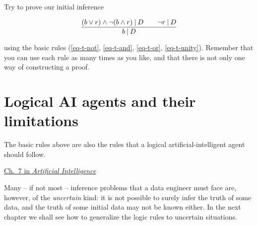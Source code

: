 \documentclass[
  a4paper,
  DIV=11,
  numbers=noendperiod,
  oneside]{scrreprt}
\begin{document}
\begin{tcolorbox}[enhanced jigsaw, bottomrule=.15mm, leftrule=.75mm, opacitybacktitle=0.6, breakable, toptitle=1mm, coltitle=black, title={\faIcon{pen} Exercise}, rightrule=.15mm, left=2mm, colframe=quarto-callout-caution-color-frame, bottomtitle=1mm, arc=.35mm, titlerule=0mm, toprule=.15mm, opacityback=0, colback=white, colbacktitle=quarto-callout-caution-color!10!white]

Try to prove our initial inference

\[
\frac{
(b \lor r) \land \lnot (b \land r) \nonscript\:\vert\nonscript\:\mathopen{} D
\qquad
\lnot r \nonscript\:\vert\nonscript\:\mathopen{} D
}{
b\nonscript\:\vert\nonscript\:\mathopen{} D
}
\]

using the basic rules (\ref{eq-t-not}, \ref{eq-t-and}, \ref{eq-t-or},
\ref{eq-t-unity}). Remember that you can use each rule as many times as
you like, and that there is not only one way of constructing a proof.

\end{tcolorbox}

\hypertarget{logical-ai-agents-and-their-limitations}{%
\section{Logical AI agents and their
limitations}\label{logical-ai-agents-and-their-limitations}}

The basic rules above are also the rules that a logical
artificial-intelligent agent should follow.

\begin{tcolorbox}[enhanced jigsaw, bottomrule=.15mm, leftrule=.75mm, opacitybacktitle=0.6, breakable, toptitle=1mm, coltitle=black, title={\faIcon{book-open} Reading}, rightrule=.15mm, left=2mm, colframe=quarto-callout-caution-color-frame, bottomtitle=1mm, arc=.35mm, titlerule=0mm, toprule=.15mm, opacityback=0, colback=white, colbacktitle=quarto-callout-caution-color!10!white]

\href{https://hvl.instructure.com/courses/25074/modules/items/660089}{Ch.~7
in \emph{Artificial Intelligence}}

\end{tcolorbox}

Many -- if not most -- inference problems that a data engineer must face
are, however, of the \emph{uncertain} kind: it is not possible to surely
infer the truth of some data, and the truth of some initial data may not
be known either. In the next chapter we shall see how to generalize the
logic rules to uncertain situations.
\end{document}
